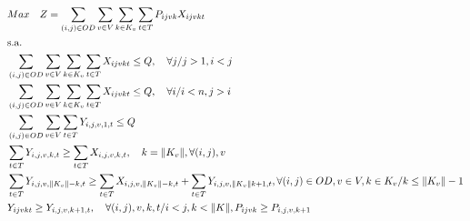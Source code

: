 \begin{align}
	 & Max \quad Z = \sum_{(i,j)\in OD} \sum_{v\in V} \sum_{k\in K_v} \sum_{t\in T} P_{ijvk} X_{ijvkt}                                                        \label{eq: m2_fo}                                                                                                                \\
	 & \text{s.a.}  \notag                                                                                                                                                                                                                                                                     \\
	 & \sum_{(i,j)\in OD}\sum_{v\in V}\sum_{k\in K_v}\sum_{t\in T}X_{ijvkt} \leq Q , \quad \forall j / j>1, i<j                                               \label{eq: m2_cap_assig_destino}                                                                                                 \\
	 & \sum_{(i,j)\in OD}\sum_{v\in V}\sum_{k\in K_v}\sum_{t\in T}X_{ijvkt} \leq Q , \quad \forall i / i<n, j>i                                                \label{eq: m2_cap_assig_origem}                                                                                                 \\
	 & \sum_{(i,j) \in OD}\sum_{v\in V}\sum_{t\in T} Y_{i,j,v,1,t} \leq Q                                                                                     \label{eq: m2_cap_autho_1er_class}                                                                                               \\
	 & \sum_{t\in T} Y_{i,j,v,k,t} \geq  \sum_{t\in T} X_{i,j,v,k,t},  \quad k = \lVert K_v \rVert, \forall(i,j),v                                            \label{eq: m2_autho_mayor_assig_1er_class}                                                                                       \\
	 & \sum_{t\in T} Y_{i,j,v,\lVert K_v \rVert - k,t} \geq  \sum_{t\in T} X_{i,j,v,\lVert K_v \rVert - k,t} + \sum_{t\in T} Y_{i,j,v,\lVert K_v \rVert k + 1,t} , \forall(i,j)\in OD,v \in V, k \in K_v / k \leq \lVert K_v\rVert - 1            \label{eq: m2_autho_mayor_assig_mas_autho-1} \\
	 & Y_{ijvkt} \geq Y_{i,j,v,k+1,t},  \quad \forall (i,j),v,k,t / i < j, k < \lVert K \rVert,  P_{ijvk} \geq P_{i,j,v,k+1}                                   \label{eq: m2_jerar_class}                                                                                                      \\

\end{align}
